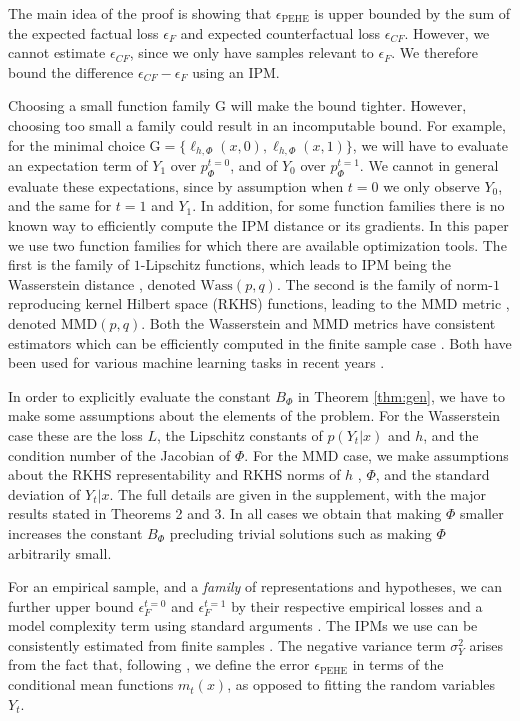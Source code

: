\documentclass{article}
\def\cF{\mathrm{G}}
\def \epehe{\epsilon_{\text{PEHE}}}
\newcommand{\pc}{p^{t=0}}
\newcommand{\pt}{p^{t=1}}
\newcommand{\lyxzeroh}{\ell_{h,\Phi}(x,0)}
\newcommand{\lyxoneh}{\ell_{h,\Phi}(x,1)}
\begin{document}
The main idea of the proof is showing that $\epehe$ is upper bounded by the sum of the expected factual loss $\epsilon_F$ and expected counterfactual loss $\epsilon_{CF}$.  However, we cannot estimate $\epsilon_{CF}$, since we only have samples relevant to $\epsilon_F$.  We therefore bound the difference $\epsilon_{CF} - \epsilon_F$ using an IPM.


Choosing a small function family $\cF$ will make the bound tighter. However, choosing too small a family could result in an incomputable bound. For example, for the minimal choice $\cF = \{\lyxzeroh, \lyxoneh  \}$, we will have to evaluate an expectation term of $Y_1$ over $\pc_\Phi$, and of $Y_0$ over $\pt_\Phi$. We cannot in general evaluate these expectations, since by assumption when $t=0$ we only observe $Y_0$, and the same for $t=1$ and $Y_1$. In addition, for some function families there is no known way to efficiently compute the IPM distance or its gradients. In this paper we use two function families for which there are available optimization tools. The first is the family of $1$-Lipschitz functions, which leads to IPM being the Wasserstein distance \citep{villani2008optimal,sriperumbudur2012empirical}, denoted $\text{Wass}(p,q)$. The second is the family of norm-$1$ reproducing kernel Hilbert space (RKHS) functions, leading to the MMD metric \citep{gretton2012mmd,sriperumbudur2012empirical}, denoted $\text{MMD}(p,q)$. Both the Wasserstein and MMD metrics have consistent estimators which can be efficiently computed in the finite sample case \citep{sriperumbudur2012empirical}. Both have been used for various machine learning tasks in recent years \citep{gretton2009covariate,gretton2012mmd,cuturi2014fast}.


In order to explicitly evaluate the constant $B_\Phi$ in Theorem \ref{thm:gen}, we have to make some assumptions about the elements of the problem. For the Wasserstein case these are the loss $L$, the Lipschitz constants of $p(Y_t|x)$ and $h$, and the condition number of the Jacobian of $\Phi$. For the MMD case, we make assumptions about the RKHS representability and RKHS norms of $h$ , $\Phi$, and the standard deviation of $Y_t|x$. The full details are given in the supplement, with the major results stated in Theorems 2 and 3. In all cases we obtain that making $\Phi$ smaller increases the constant $B_\Phi$ precluding trivial solutions such as making $\Phi$ arbitrarily small.


For an empirical sample, and a \emph{family} of representations and hypotheses, we can further upper bound $\epsilon_F^{t=0}$ and $\epsilon_F^{t=1}$ by their respective empirical losses and a model complexity term using standard arguments \citep{shalev2014understanding}. The IPMs we use can be consistently estimated from finite samples \citep{sriperumbudur2012empirical}. The negative variance term $\sigma^2_Y$ arises from the fact that, following \citet{hill2011bayesian,athey2016recursive}, we define the error $\epehe$ in terms of the conditional mean functions $m_t(x)$, as opposed to fitting the random variables $Y_t$.
\end{document}
